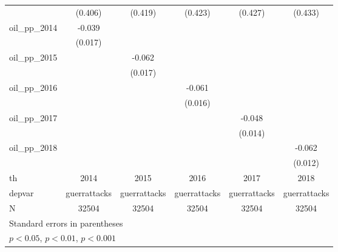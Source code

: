 {\begin{tabular}{l*{5}{c}}
            &     (0.406)         &     (0.419)         &     (0.423)         &     (0.427)         &     (0.433)         \\
[1em]
oil\_pp\_2014 &      -0.039\sym{*}  &                     &                     &                     &                     \\
            &     (0.017)         &                     &                     &                     &                     \\
[1em]
oil\_pp\_2015 &                     &      -0.062\sym{***}&                     &                     &                     \\
            &                     &     (0.017)         &                     &                     &                     \\
[1em]
oil\_pp\_2016 &                     &                     &      -0.061\sym{***}&                     &                     \\
            &                     &                     &     (0.016)         &                     &                     \\
[1em]
oil\_pp\_2017 &                     &                     &                     &      -0.048\sym{***}&                     \\
            &                     &                     &                     &     (0.014)         &                     \\
[1em]
oil\_pp\_2018 &                     &                     &                     &                     &      -0.062\sym{***}\\
            &                     &                     &                     &                     &     (0.012)         \\
\hline
th          &        2014         &        2015         &        2016         &        2017         &        2018         \\
depvar      &guerrattacks         &guerrattacks         &guerrattacks         &guerrattacks         &guerrattacks         \\
N           &       32504         &       32504         &       32504         &       32504         &       32504         \\
\hline\hline
\multicolumn{6}{l}{\footnotesize Standard errors in parentheses}\\
\multicolumn{6}{l}{\footnotesize \sym{*} \(p<0.05\), \sym{**} \(p<0.01\), \sym{***} \(p<0.001\)}\\
\end{tabular}
}
